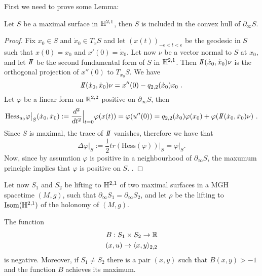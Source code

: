 First we need to prove some Lemma:
\begin{lemma} \label{lem:conv}
    Let $S$ be a maximal surface in $\mathbb{H}^{2,1}$, then $S$ is included in the convex hull of $\partial_\infty S$.
\end{lemma}
\begin{proof}
    Fix $x_0 \in S$ and $\dot{x}_0\in T_x S$ and let $(x(t))_{-\epsilon < t < \epsilon}$ be the geodesic in $S$ such that $x(0)= x_0$ and $x'(0)= \dot{x}_0$. Let now $\nu$ be a vector normal to $S$ at $x_0$, and let $\II$ be the second fundamental form of $S$ in $\mathbb{H}^{2,1}$. Then $\II(\dot{x}_0,\dot{x}_0)\nu$ is the orthogonal projection of $x''(0)$ to $T_{x_0} S$. We have
    \[
        \II(\dot{x}_0,\dot{x}_0)\nu = x''(0) - q_{2,2}(\dot{x}_0) x_0 \ .
    \]
    Let $\varphi$ be a linear form on $\mathbb{R}^{2,2}$ positive on $\partial_\infty S$, then
    \[
        \text{Hess}_{u_0}\varphi \big|_{S}(\dot{x}_0, \dot{x}_0) := \frac{d^2}{dt^2}\Big|_{t=0} \varphi(x(t)) = \varphi(u''(0)) = q_{2,2}(\dot{x}_0)\varphi(x_0) + \varphi(\II(\dot{x}_0, \dot{x}_0)\nu) \ .
    \]
    Since $S$ is maximal, the trace of $\II$ vanishes, therefore we have that
    \[
        \Delta \varphi \big|_S := \frac{1}{2} tr(\text{Hess}(\varphi)) \big|_S = \varphi \big|_S .
    \]
    Now, since by assumtion $\varphi$ is positive in a neighbourhood of $\partial_\infty S$, the maxumum principle implies that $\varphi$ is positive on $S$. .
\end{proof}
Let now $S_1$ and $S_2$ be lifting to $\mathbb{H}^{2,1}$ of two maximal surfaces in a MGH spacetime $(M,g)$, such that $\partial_\infty S_1 = \partial_\infty S_2$, and let $\rho$ be the lifting to $\text{Isom}(\mathbb{H}^{2,1})$ of the holonomy of $(M,g)$. 
\begin{lemma}\label{lem:maxgen}
    The function 
    \[
    \begin{split}
        B: S_1 \times S_2 \to \mathbb{R} \\
        (x,u) \to \langle x,y \rangle_{2,2}
    \end{split}
    \]
    is negative. Moreover, if $S_1 \neq S_2$ there is a pair $(x,y)$ such that $B(x,y) > -1$ and the function $B$ achieves its maximum.
\end{lemma}
